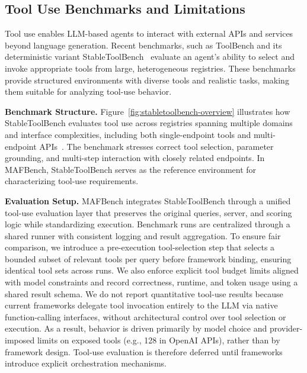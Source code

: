 \vspace{-2mm}
\subsection{Tool Use Benchmarks and Limitations}
\label{sec:tools-benchmark}

Tool use enables LLM-based agents to interact with external APIs and services beyond language generation. Recent benchmarks, such as ToolBench and its deterministic variant StableToolBench~\cite{guo2024stabletoolbench,qin2025tool,qintoolllm} evaluate an agent’s ability to select and invoke appropriate tools from large, heterogeneous registries. These benchmarks provide structured environments with diverse tools and realistic tasks, making them suitable for analyzing tool-use behavior.


\noindent\textbf{Benchmark Structure.}
Figure~\ref{fig:stabletoolbench-overview} illustrates how StableToolBench evaluates tool use across registries spanning multiple domains and interface complexities, including both single-endpoint tools and multi-endpoint APIs~\cite{guo2024stabletoolbench}. The benchmark stresses correct tool selection, parameter grounding, and multi-step interaction with closely related endpoints. In MAFBench, StableToolBench serves as the reference environment for characterizing tool-use requirements.

\noindent\textbf{Evaluation Setup.}
MAFBench integrates StableToolBench through a unified tool-use evaluation layer that preserves the original queries, server, and scoring logic while standardizing execution. Benchmark runs are centralized through a shared runner with consistent logging and result aggregation. To ensure fair comparison, we introduce a pre-execution tool-selection step that selects a bounded subset of relevant tools per query before framework binding, ensuring identical tool sets across runs. We also enforce explicit tool budget limits aligned with model constraints and record correctness, runtime, and token usage using a shared result schema.
%
We do not report quantitative tool-use results because current frameworks delegate tool invocation entirely to the LLM via native function-calling interfaces, without architectural control over tool selection or execution. As a result, behavior is driven primarily by model choice and provider-imposed limits on exposed tools (e.g., 128 in OpenAI APIs), rather than by framework design. Tool-use evaluation is therefore deferred until frameworks introduce explicit orchestration mechanisms.


